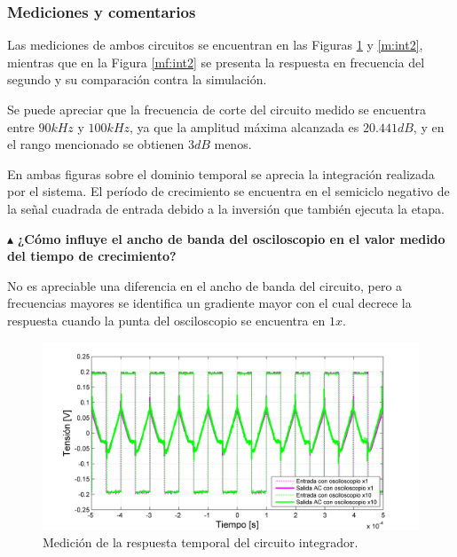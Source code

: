 \subsubsection{Mediciones y comentarios}

Las mediciones de ambos circuitos se encuentran en las Figuras \ref{m:int1} y \ref{m:int2}, mientras que en la Figura \ref{mf:int2} se presenta la respuesta en frecuencia del segundo y su comparación contra la simulación.


Se puede apreciar que la frecuencia de corte del circuito medido se encuentra entre $90kHz$ y $100kHz$, ya que la amplitud máxima alcanzada es $20.441dB$, y en el rango mencionado se obtienen $3dB$ menos.


En ambas figuras sobre el dominio temporal se aprecia la integración realizada por el sistema. El período de crecimiento se encuentra en el semiciclo negativo de la señal cuadrada de entrada debido a la inversión que también ejecuta la etapa.


\noindent$\blacktriangle$\textbf{ ¿Cómo influye el ancho de banda del osciloscopio en el valor medido del tiempo de crecimiento?}

No es apreciable una diferencia en el ancho de banda del circuito, pero a  frecuencias mayores se identifica un gradiente mayor con el cual decrece la respuesta cuando la punta del osciloscopio se encuentra en $1x$.




\begin{figure}[H]
  \centering
\includegraphics[width=1.1\textwidth]{gfx_22/INT1_M}
  \caption{Medición de la respuesta temporal del circuito integrador.}
  \label{m:int1}
\end{figure}

